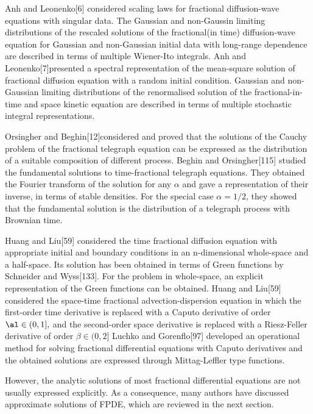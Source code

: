 {Anh and Leonenko[6] considered scaling laws for fractional diffusion-wave equations with singular data. The Gaussian and non-Gaussin limiting distributions of the rescaled solutions of the fractional(in time) diffusion-wave equation for Gaussian and non-Gaussian initial data with long-range dependence are described in terms of multiple Wiener-Ito integrals. Anh and Leonenko[7]presented a spectral representation of the mean-square solution of fractional diffusion equation with a random initial condition. Gaussian and non-Gaussian limiting distributions of the renormalised solution of the fractional-in-time and space kinetic equation are described in terms of multiple stochastic integral representations.\

Orsingher and Beghin[12]considered and proved that the solutions of the Cauchy problem of the fractional telegraph equation can be expressed as the distribution of a suitable composition of different process. Beghin and Orsingher[115] studied the fundamental solutions to time-fractional telegraph equations. They obtained the Fourier transform of the solution for any $\alpha$ and gave a representation of their inverse, in terms of stable densities. For the special case $\alpha=1/2$, they showed that the fundamental solution is the distribution of a telegraph process with Brownian time.\

Huang and Liu[59] considered the time fractional diffusion equation with appropriate initial and boundary conditions in an n-dimensional whole-space and a half-space. Its solution has been obtained in terms of Green functions by Schneider and Wyss[133]. For the problem in whole-space, an explicit representation of the Green functions can be obtained.
Huang and Liu[59] considered the space-time fractional advection-dispersion equation in which the first-order time derivative is replaced with a Caputo derivative of order $\al \in (0,1],$ and the second-order space derivative is replaced with a Riesz-Feller derivative of order $\beta \in(0,2]$ Luchko and Gorenflo[97] developed an operational method for solving fractional differential equations with Caputo derivatives and the obtained solutions are expressed through Mittag-Leffler type functions.\

However, the analytic solutions of most fractional differential equations are not usually expressed explicitly. As a consequence, many authors have discussed approximate solutions of FPDE, which are reviewed in the next section.\

\chead{}
}
